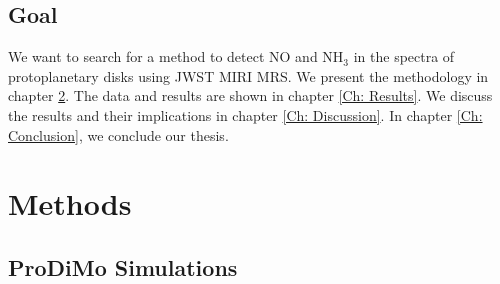 \documentclass[twoside, single, authoryear, semicolon]{lion-msc}
\newcommand{\4}{$_4$}
\newcommand{\3}{$_3$}
\newcommand{\2}{$_2$}
\begin{document}
\section{Goal}
We want to search for a method to detect NO and NH\3 in the spectra of protoplanetary disks using JWST MIRI MRS. 
We present the methodology in chapter \ref{Ch: Methods}. The data and results are shown in chapter \ref{Ch: Results}. We discuss the results and their implications in chapter \ref{Ch: Discussion}. In chapter \ref{Ch: Conclusion}, we conclude our thesis.
\chapter{Methods}\label{Ch: Methods}
\section{ProDiMo Simulations}
\end{document}
